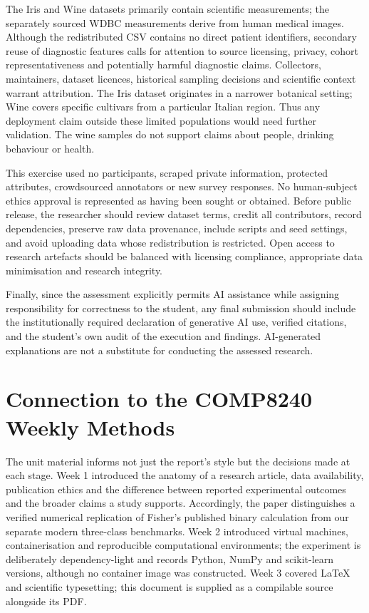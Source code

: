 \documentclass[11pt]{article}
\begin{document}
The Iris and Wine datasets primarily contain scientific measurements; the separately sourced WDBC measurements derive from human medical images. Although the redistributed CSV contains no direct patient identifiers, secondary reuse of diagnostic features calls for attention to source licensing, privacy, cohort representativeness and potentially harmful diagnostic claims. Collectors, maintainers, dataset licences, historical sampling decisions and scientific context warrant attribution. The Iris dataset originates in a narrower botanical setting; Wine covers specific cultivars from a particular Italian region. Thus any deployment claim outside these limited populations would need further validation. The wine samples do not support claims about people, drinking behaviour or health.

This exercise used no participants, scraped private information, protected attributes, crowdsourced annotators or new survey responses. No human-subject ethics approval is represented as having been sought or obtained. Before public release, the researcher should review dataset terms, credit all contributors, record dependencies, preserve raw data provenance, include scripts and seed settings, and avoid uploading data whose redistribution is restricted. Open access to research artefacts should be balanced with licensing compliance, appropriate data minimisation and research integrity.

Finally, since the assessment explicitly permits AI assistance while assigning responsibility for correctness to the student, any final submission should include the institutionally required declaration of generative AI use, verified citations, and the student's own audit of the execution and findings. AI-generated explanations are not a substitute for conducting the assessed research.


\section{Connection to the COMP8240 Weekly Methods}
The unit material informs not just the report's style but the decisions made at each stage. Week 1 introduced the anatomy of a research article, data availability, publication ethics and the difference between reported experimental outcomes and the broader claims a study supports. Accordingly, the paper distinguishes a verified numerical replication of Fisher's published binary calculation from our separate modern three-class benchmarks. Week 2 introduced virtual machines, containerisation and reproducible computational environments; the experiment is deliberately dependency-light and records Python, NumPy and scikit-learn versions, although no container image was constructed. Week 3 covered LaTeX and scientific typesetting; this document is supplied as a compilable source alongside its PDF.
\end{document}
